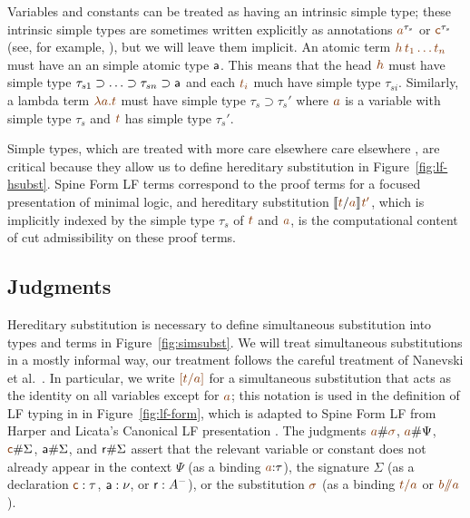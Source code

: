 Variables and constants can be treated as having an intrinsic simple
type; these intrinsic simple types are sometimes written explicitly as
annotations $\lf{a}^{\tau_s}$ or $\lf{\sf c}^{\tau_s}$ (see, for
example, \cite{pfenning08church}), but we will leave them implicit.
An atomic term $\lf{h\,t_1\ldots t_n}$ must have an an simple atomic
type ${\sf a}$. This means that the head $\lf h$ must have simple type
$\tau_{s1} \supset \ldots \supset \tau_{sn} \supset {\sf a}$ and each
$\lf{t_i}$ much have simple type $\tau_{si}$. Similarly, a lambda term
$\lf{\lambda a. t}$ must have simple type $\tau_s \supset \tau_s'$
where $\lf a$ is a variable with simple type $\tau_s$ and $\lf t$ has
simple type $\tau_s'$.  

Simple types, which are treated with more care elsewhere care
elsewhere \cite{harper07mechanizing,reed09hybrid}, are critical
because they allow us to define hereditary substitution in
Figure~\ref{fig:lf-hsubst}. Spine Form LF terms correspond to the
proof terms for a focused presentation of minimal logic, and
hereditary substitution $\rsubst{\lf t}{\lf a}{\lf{t'}}$, which is
implicitly indexed by the simple type $\tau_s$ of $\lf t$ and $\lf a$,
is the computational content of cut admissibility on these proof
terms. 

\subsection{Judgments}

Hereditary substitution is necessary to define simultaneous
substitution into types and terms in Figure~\ref{fig:simsubst}.  We
will treat simultaneous substitutions in a mostly informal way, our
treatment follows the careful treatment of Nanevski et
al.~\cite{nanevski08contextual}. In particular, we write $\lf{[t/a]}$
for a simultaneous substitution that acts as the identity on all
variables except for $\lf{a}$; this notation is used in the definition
of LF typing in in Figure~\ref{fig:lf-form}, which is adapted to Spine
Form LF from Harper and Licata's Canonical LF presentation
\cite{harper07mechanizing}. The judgments
$\lf{a}\#\lf{\sigma}$, $\lf{a}\#\Psi$, $\lf{\sf c}\#\Sigma$, ${\sf
  a}\#\Sigma$, and ${\sf r}\#\Sigma$ assert that the relevant variable
or constant does not already appear in the context $\Psi$ (as a
binding $\lf{a}{:}\tau$), the signature $\Sigma$ (as a declaration
$\lf{\sf c} : \tau$, ${\sf a} : \nu$, or ${\sf r} : A^-$), or the
substitution $\lf{\sigma}$ (as a binding $\lf{t/a}$ or
\mbox{$\lf{b/\!\!/a}$}).

